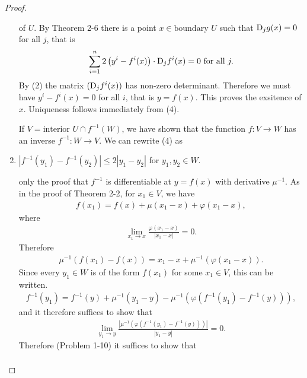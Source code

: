 \begin{proof}
\begin{enumerate}[label={\textup{\arabic*.\,}}]
            of $U$. By Theorem 2-6 there is a point $x\in\text{boundary } U$ such that $\mathrm{D}_jg(x) = 0$ for all 
            $j$, that is 
            \begin{align*}
                \sum_{i=1}^{n}{2\left(y^i - f^i(x)\right)\cdot \mathrm{D}_jf^i(x)} = 0 \text{ for all } j.
            \end{align*}
            By (2) the matrix $(\mathrm{D}_jf^i(x))$ has non-zero determinant. Therefore we must have $y^i - f^i(x) = 0$
            for all $i$, that is $y=f(x)$. This proves the exsitence of $x$. Uniqueness follows immediately 
            from (4). 

            If $V = \text{interior } U \cap f^{-1}(W)$, we have shown that the function 
            $f\colon{}V\to W$ has an inverse $f^{-1}\colon{}W\to V$. We can rewrite (4) as 
        \item $|f^{-1}(y_1) - f^{-1}(y_2)| \le 2|y_1 - y_2|$ for $y_1, y_2\in W$.\par 
            only the proof that $f^{-1}$ is differentiable at $y=f(x)$ with derivative 
            $\mu^{-1}$. As in the proof of Theorem 2-2, for $x_1\in V$, we have
            \begin{align*}
                f(x_1) = f(x) + \mu(x_1 - x) + \varphi(x_1 - x),
            \end{align*}
            where 
            \begin{align*}
                \lim_{x_1\to x}{\frac{\varphi(x_1 - x)}{|x_1 - x|}} = 0.
            \end{align*}
            Therefore 
            \begin{align*}
                \mu^{-1}\left(f(x_1) - f(x)\right) = x_1 - x + \mu^{-1}\left(\varphi(x_1 - x)\right).
            \end{align*}
            Since every $y_1\in W$ is of the form $f(x_1)$ for some $x_1\in V$, this can be written.
            \begin{align*}
                f^{-1}(y_1) = f^{-1}(y) + \mu^{-1}(y_1 - y) - \mu^{-1}\left(\varphi(f^{-1}(y_1) - f^{-1}(y))\right),
            \end{align*}
            and it therefore suffices to show that
            \begin{align*}
                \lim_{y_1\to y}\frac{\left|\mu^{-1}(\varphi(f^{-1}(y_1)-f^{-1}(y)))\right|}{|y_1-y|} = 0.   
            \end{align*}
            Therefore (Problem 1-10) it suffices to show that
            \begin{align*}

\end{align*}
\end{enumerate}
\end{proof}
